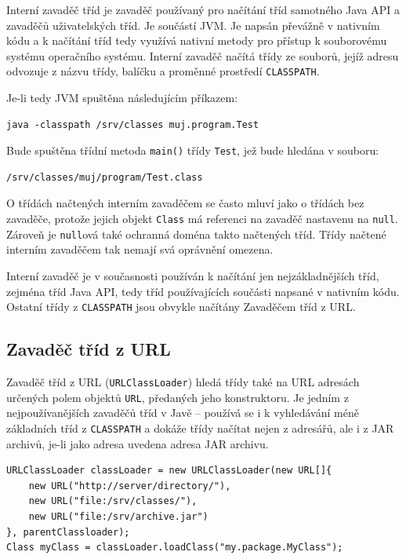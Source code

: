 Interní zavaděč tříd je zavaděč používaný pro načítání tříd samotného Java API a zavaděčů uživatelských tříd.
Je součástí JVM. Je napsán převážně v nativním kódu a k načítání tříd tedy využívá nativní metody pro přístup k souborovému systému operačního systému.
Interní zavaděč načítá třídy ze souborů, jejíž adresu odvozuje z názvu třídy, balíčku a proměnné prostředí {\tt CLASSPATH}. \cite[3.2.1]{oaks}

Je-li tedy JVM spuštěna následujícím příkazem:

\begin{verbatim}
java -classpath /srv/classes muj.program.Test
\end{verbatim}

Bude spuštěna třídní metoda {\tt main()} třídy {\tt Test}, jež bude hledána v souboru:

\begin{verbatim}
/srv/classes/muj/program/Test.class
\end{verbatim}

O třídách načtených interním zavaděčem se často mluví jako o třídách bez zavaděče, protože jejich objekt {\tt Class} má referenci na zavaděč nastavenu na {\tt null}. \cite[3.2.1]{oaks} Zároveň je {\tt null}ová také ochranná doména takto načtených tříd. Třídy načtené interním zavaděčem tak nemají svá oprávnění omezena.

Interní zavaděč je v současnosti používán k načítání jen nejzákladnějších tříd, zejména tříd Java API, tedy tříd používajících součásti napsané v nativním kódu. Ostatní třídy z {\tt CLASSPATH} jsou obvykle načítány Zavaděčem tříd z URL.

\subsection{Zavaděč tříd z URL}

Zavaděč tříd z URL ({\tt URLClassLoader}) hledá třídy také na URL adresách určených polem objektů {\tt URL}, předaných jeho konstruktoru. Je jedním z nejpoužívanějších zavaděčů tříd v Javě -- používá se i k vyhledávání méně základních tříd z {\tt CLASSPATH} a dokáže třídy načítat nejen z adresářů, ale i z JAR archivů, je-li jako adresa uvedena adresa JAR archivu. \cite[3.2.5]{oaks}

\begin{lstlisting}[caption=Vytvoření vlastní instance zavaděče tříd z URL, label=urlclassloader]
URLClassLoader classLoader = new URLClassLoader(new URL[]{
    new URL("http://server/directory/"),
    new URL("file:/srv/classes/"),
    new URL("file:/srv/archive.jar")
}, parentClassloader);
Class myClass = classLoader.loadClass("my.package.MyClass");
\end{lstlisting}

